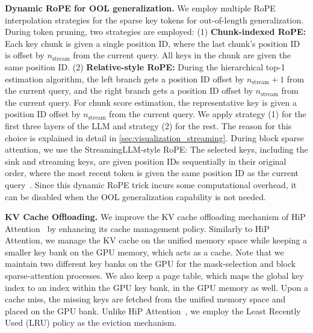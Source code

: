 \textbf{Dynamic RoPE for OOL generalization.}
We employ multiple RoPE interpolation strategies for the sparse key tokens for out-of-length generalization. 
During token pruning, two strategies are employed:
(1) \textbf{Chunk-indexed RoPE:}
Each key chunk is given a single position ID, where the last chunk's position ID is offset by $n_\text{stream}$ from the current query. All keys in the chunk are given the same position ID.
(2) \textbf{Relative-style RoPE:}
During the hierarchical top-1 estimation algorithm, the left branch gets a position ID offset by $n_\text{stream} + 1$ from the current query, and the right branch gets a position ID offset by $n_\text{stream}$ from the current query. For chunk score estimation, the representative key is given a position ID offset by $n_\text{stream}$ from the current query.
We apply strategy (1) for the first three layers of the LLM and strategy (2) for the rest. The reason for this choice is explained in detail in \cref{sec:visualization_streaming}.
During block sparse attention, we use the StreamingLLM-style RoPE: The selected keys, including the sink and streaming keys, are given position IDs sequentially in their original order, where the most recent token is given the same position ID as the current query~\citep{xiao_efficient_2024}.
Since this dynamic RoPE trick incurs some computational overhead, it can be disabled when the OOL generalization capability is not needed.

\textbf{KV Cache Offloading.}
We improve the KV cache offloading mechanism of HiP Attention~\citep{lee_training-free_2024} by enhancing its cache management policy.
Similarly to HiP Attention, we manage the KV cache on the unified memory space while keeping a smaller key bank on the GPU memory, which acts as a cache.
Note that we maintain two different key banks on the GPU for the mask-selection and block sparse-attention processes.
We also keep a page table, which maps the global key index to an index within the GPU key bank, in the GPU memory as well.
Upon a cache miss, the missing keys are fetched from the unified memory space and placed on the GPU bank.
Unlike HiP Attention~\citep{lee_training-free_2024}, we employ the Least Recently Used (LRU) policy as the eviction mechanism.

